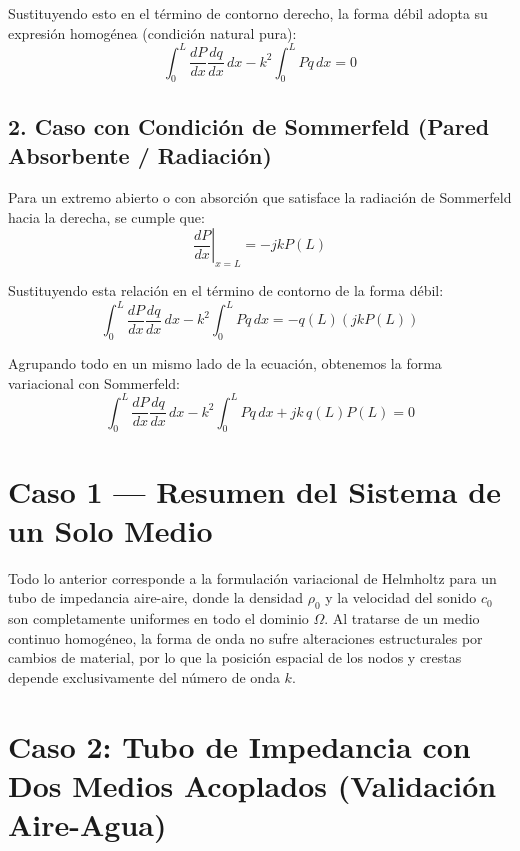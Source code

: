 \documentclass[11pt,letterpaper]{article}
\begin{document}
Sustituyendo esto en el término de contorno derecho, la forma débil adopta su expresión homogénea (condición natural pura):
\begin{equation}
    \int_0^L \frac{dP}{dx} \frac{dq}{dx} \, dx - k^2 \int_0^L P q \, dx = 0
\end{equation}

\subsection{2. Caso con Condición de Sommerfeld (Pared Absorbente / Radiación)}
Para un extremo abierto o con absorción que satisface la radiación de Sommerfeld hacia la derecha, se cumple que:
\begin{equation}
    \left. \frac{dP}{dx} \right|_{x=L} = -j k P(L)
\end{equation}

Sustituyendo esta relación en el término de contorno de la forma débil:
\begin{equation}
    \int_0^L \frac{dP}{dx} \frac{dq}{dx} \, dx - k^2 \int_0^L P q \, dx = -q(L) \left( j k P(L) \right)
\end{equation}

Agrupando todo en un mismo lado de la ecuación, obtenemos la forma variacional con Sommerfeld:
\begin{equation}
    \int_0^L \frac{dP}{dx} \frac{dq}{dx} \, dx - k^2 \int_0^L P q \, dx + j k \, q(L) P(L) = 0
\end{equation}

\section{Caso 1 --- Resumen del Sistema de un Solo Medio}
Todo lo anterior corresponde a la formulación variacional de Helmholtz para un tubo de impedancia aire-aire, donde la densidad $\rho_0$ y la velocidad del sonido $c_0$ son completamente uniformes en todo el dominio $\Omega$. Al tratarse de un medio continuo homogéneo, la forma de onda no sufre alteraciones estructurales por cambios de material, por lo que la posición espacial de los nodos y crestas depende exclusivamente del número de onda $k$.

\section{Caso 2: Tubo de Impedancia con Dos Medios Acoplados (Validación Aire-Agua)}\label{sec:caso2}
\end{document}
